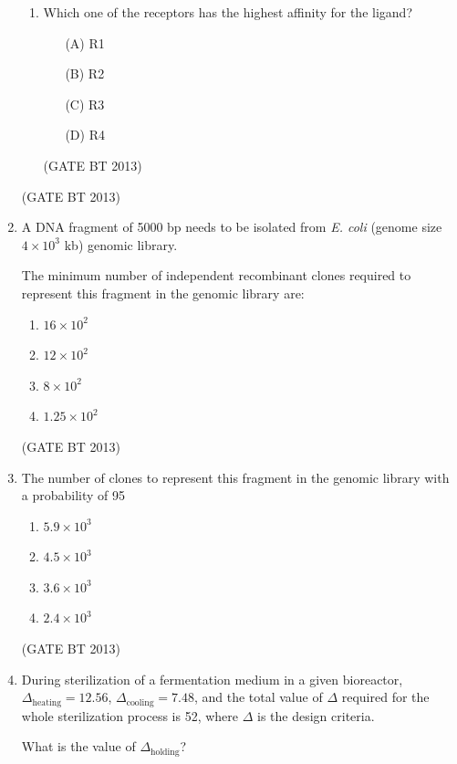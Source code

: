 \documentclass[journal,12pt,onecolumn]{IEEEtran}
\theoremstyle{remark}
\begin{document}
\begin{enumerate}
\begin{enumerate}
    \item Which one of the receptors has the highest affinity for the ligand?
    \begin{enumerate}
        \item[(A)] R1
        \item[(B)] R2
        \item[(C)] R3
        \item[(D)] R4
    \end{enumerate} \hfill(GATE BT 2013)
\end{enumerate} \hfill(GATE BT 2013)

\item 

A DNA fragment of 5000 bp needs to be isolated from \textit{E. coli} (genome size \(4 \times 10^{3}\) kb) genomic library.

The minimum number of independent recombinant clones required to represent this fragment in the genomic library are:

\begin{enumerate}
    \item \(16 \times 10^{2}\)
    \item \(12 \times 10^{2}\)
    \item \(8 \times 10^{2}\)
    \item \(1.25 \times 10^{2}\)
\end{enumerate} \hfill(GATE BT 2013)

\item 

The number of clones to represent this fragment in the genomic library with a probability of 95%

\begin{enumerate}
    \item \(5.9 \times 10^{3}\)
    \item \(4.5 \times 10^{3}\)
    \item \(3.6 \times 10^{3}\)
    \item \(2.4 \times 10^{3}\)
\end{enumerate} \hfill(GATE BT 2013)

\item 

During sterilization of a fermentation medium in a given bioreactor, \(\Delta_{\text{heating}} = 12.56\), \(\Delta_{\text{cooling}} = 7.48\), and the total value of \(\Delta\) required for the whole sterilization process is 52, where \(\Delta\) is the design criteria.

What is the value of \(\Delta_{\text{holding}}\)?


\end{enumerate}
\end{document}
